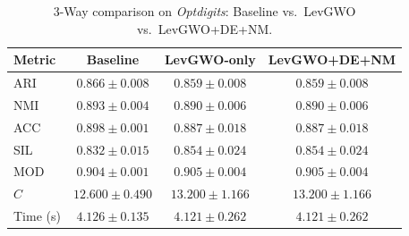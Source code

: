 \begin{table}[htbp]
\centering
\caption{3-Way comparison on \textit{Optdigits}: Baseline vs.\ LevGWO vs.\ LevGWO+DE+NM.}
\label{tab:optdigits_3way}
\begin{tabular}{lccc}
\toprule
Metric & Baseline & LevGWO-only & LevGWO+DE+NM \\
\midrule
ARI & $\mathbf{0.866 \pm 0.008}$ & $0.859 \pm 0.008$ & $0.859 \pm 0.008$ \\
NMI & $\mathbf{0.893 \pm 0.004}$ & $0.890 \pm 0.006$ & $0.890 \pm 0.006$ \\
ACC & $\mathbf{0.898 \pm 0.001}$ & $0.887 \pm 0.018$ & $0.887 \pm 0.018$ \\
SIL & $0.832 \pm 0.015$ & $\mathbf{0.854 \pm 0.024}$ & $\mathbf{0.854 \pm 0.024}$ \\
MOD & $0.904 \pm 0.001$ & $\mathbf{0.905 \pm 0.004}$ & $\mathbf{0.905 \pm 0.004}$ \\
$C$ & $12.600 \pm 0.490$ & $13.200 \pm 1.166$ & $13.200 \pm 1.166$ \\
Time (s) & $4.126 \pm 0.135$ & $4.121 \pm 0.262$ & $4.121 \pm 0.262$ \\
\bottomrule
\end{tabular}
\end{table}